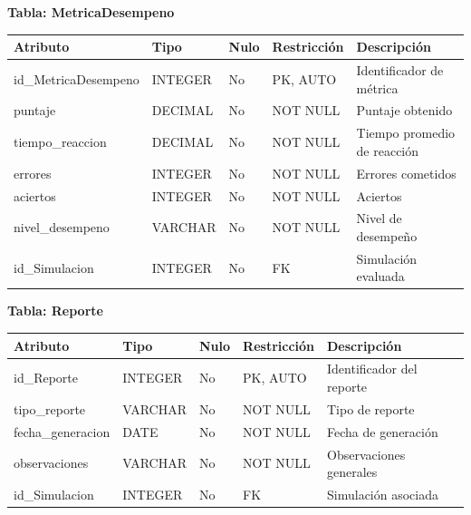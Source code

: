 \documentclass[12pt]{article}
\begin{document}
\textbf{Tabla: MetricaDesempeno}
\begin{table}[H]
\centering
\begin{tabular}{|p{3cm}|p{2cm}|p{1cm}|p{2cm}|p{5cm}|}
\hline
\textbf{Atributo} & \textbf{Tipo} & \textbf{Nulo} & \textbf{Restricción} & \textbf{Descripción} \\ \hline
id\_MetricaDesempeno & INTEGER & No & PK, AUTO & Identificador de métrica \\ \hline
puntaje & DECIMAL & No & NOT NULL & Puntaje obtenido \\ \hline
tiempo\_reaccion & DECIMAL & No & NOT NULL & Tiempo promedio de reacción \\ \hline
errores & INTEGER & No & NOT NULL & Errores cometidos \\ \hline
aciertos & INTEGER & No & NOT NULL & Aciertos \\ \hline
nivel\_desempeno & VARCHAR & No & NOT NULL & Nivel de desempeño \\ \hline
id\_Simulacion & INTEGER & No & FK & Simulación evaluada \\ \hline
\end{tabular}
\end{table}

\textbf{Tabla: Reporte}
\begin{table}[H]
\centering
\begin{tabular}{|p{3cm}|p{2cm}|p{1cm}|p{2cm}|p{5cm}|}
\hline
\textbf{Atributo} & \textbf{Tipo} & \textbf{Nulo} & \textbf{Restricción} & \textbf{Descripción} \\ \hline
id\_Reporte & INTEGER & No & PK, AUTO & Identificador del reporte \\ \hline
tipo\_reporte & VARCHAR & No & NOT NULL & Tipo de reporte \\ \hline
fecha\_generacion & DATE & No & NOT NULL & Fecha de generación \\ \hline
observaciones & VARCHAR & No & NOT NULL & Observaciones generales \\ \hline
id\_Simulacion & INTEGER & No & FK & Simulación asociada \\ \hline
\end{tabular}
\end{table}
\end{document}
